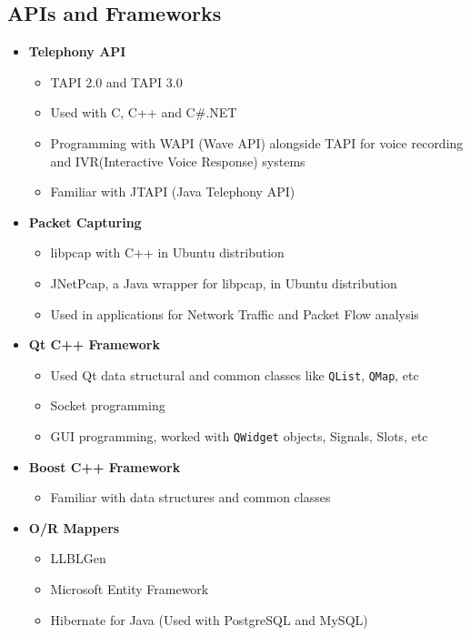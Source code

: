\documentclass[12pt,a4paper]{article}
\begin{document}
	\subsection{APIs and Frameworks}
		\begin{itemize}
			\item \textbf{Telephony API} 
				\begin{itemize}
					\item TAPI 2.0 and TAPI 3.0
					\item Used with C, C++ and C\#.NET
					\item Programming with WAPI (Wave API) alongside TAPI for voice recording and IVR(Interactive Voice Response) systems
					\item Familiar with JTAPI (Java Telephony API)
				\end{itemize}
			\item \textbf{Packet Capturing}
				\begin{itemize}
					\item libpcap with C++ in Ubuntu distribution
					\item JNetPcap, a Java wrapper for libpcap, in Ubuntu distribution
					\item Used in applications for Network Traffic and Packet Flow analysis
				\end{itemize}
			\item \textbf{Qt C++ Framework}
				\begin{itemize}
					\item Used Qt data structural and common classes like \texttt{QList}, \texttt{QMap}, etc
					\item Socket programming
					\item GUI programming, worked with \texttt{QWidget} objects, Signals, Slots, etc
				\end{itemize}
			\item \textbf{Boost C++ Framework}
				\begin{itemize}
					\item Familiar with data structures and common classes
				\end{itemize}
			\item \textbf{O/R Mappers}
				\begin{itemize}
					\item LLBLGen
					\item Microsoft Entity Framework
					\item Hibernate for Java (Used with PostgreSQL and MySQL)
				\end{itemize}

\end{itemize}
\end{document}
